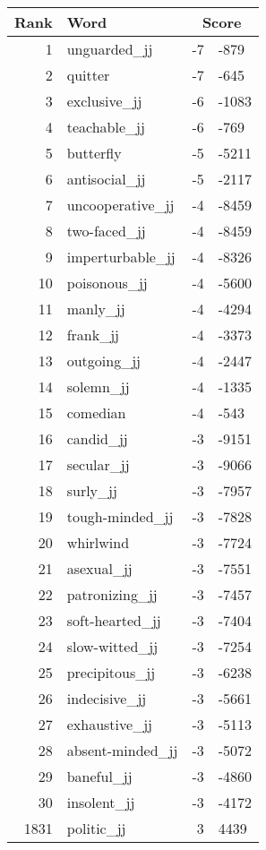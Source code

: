 \begin{longtable}[!htbp]{| rlr@{.}l |}
    \hline
    \textbf{Rank} & \textbf{Word} & \multicolumn{2}{c|}{\textbf{Score}} \\
    \hline
    \endhead
    1 & unguarded\_jj & -7 & -879 \\
    2 & quitter & -7 & -645 \\
    3 & exclusive\_jj & -6 & -1083 \\
    4 & teachable\_jj & -6 & -769 \\
    5 & butterfly & -5 & -5211 \\
    6 & antisocial\_jj & -5 & -2117 \\
    7 & uncooperative\_jj & -4 & -8459 \\
    8 & two-faced\_jj & -4 & -8459 \\
    9 & imperturbable\_jj & -4 & -8326 \\
    10 & poisonous\_jj & -4 & -5600 \\
    11 & manly\_jj & -4 & -4294 \\
    12 & frank\_jj & -4 & -3373 \\
    13 & outgoing\_jj & -4 & -2447 \\
    14 & solemn\_jj & -4 & -1335 \\
    15 & comedian & -4 & -543 \\
    16 & candid\_jj & -3 & -9151 \\
    17 & secular\_jj & -3 & -9066 \\
    18 & surly\_jj & -3 & -7957 \\
    19 & tough-minded\_jj & -3 & -7828 \\
    20 & whirlwind & -3 & -7724 \\
    21 & asexual\_jj & -3 & -7551 \\
    22 & patronizing\_jj & -3 & -7457 \\
    23 & soft-hearted\_jj & -3 & -7404 \\
    24 & slow-witted\_jj & -3 & -7254 \\
    25 & precipitous\_jj & -3 & -6238 \\
    26 & indecisive\_jj & -3 & -5661 \\
    27 & exhaustive\_jj & -3 & -5113 \\
    28 & absent-minded\_jj & -3 & -5072 \\
    29 & baneful\_jj & -3 & -4860 \\
    30 & insolent\_jj & -3 & -4172 \\
    1831 & politic\_jj & 3 & 4439 \\

\end{longtable}
